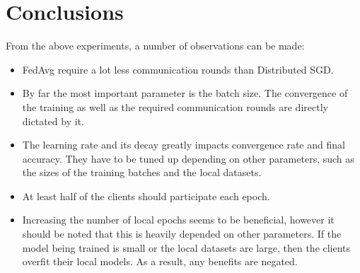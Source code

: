 \section{Conclusions}
From the above experiments, a number of observations can be made:
\begin{itemize}
    \item FedAvg require a lot less communication rounds than Distributed SGD.
    \item By far the most important parameter is the batch size. The convergence of the training as well as the required communication rounds are directly dictated by it.
    \item The learning rate and its decay greatly impacts convergence rate and final accuracy. They have to be tuned up depending on other parameters, such as the sizes of the training batches and the local datasets.
    \item At least half of the clients should participate each epoch.
    \item Increasing the number of local epochs seems to be beneficial, however it should be noted that this is heavily depended on other parameters. If the model being trained is small or the local datasets are large, then the clients overfit their local models. As a result, any benefits are negated.
\end{itemize}